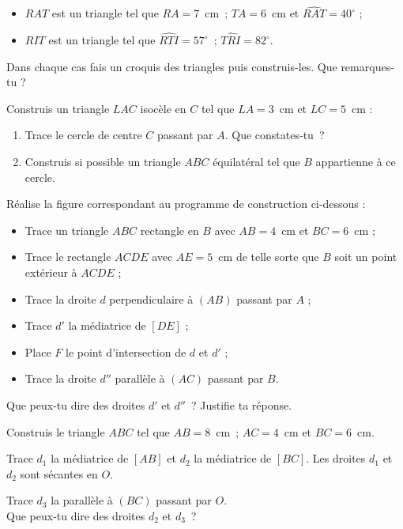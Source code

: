 \begin{exercice}
\begin{itemize}
 \item $RAT$ est un triangle tel que $RA = 7$ cm ; $TA = 6$ cm et $\widehat{RAT} = 40^\circ$ ;
 \item $RIT$ est un triangle tel que $\widehat{RTI} = 57^\circ$ ; $\widehat{TRI} = 82^\circ$.
 \end{itemize}
Dans chaque cas fais un croquis des triangles puis construis-les. Que remarques-tu ? 
\end{exercice}


\begin{exercice}
Construis un triangle $LAC$ isocèle en $C$ tel que $LA = 3$ cm et $LC = 5$ cm :
\begin{enumerate}
 \item Trace le cercle de centre $C$ passant par $A$. Que constates‑tu ?
 \item Construis si possible un triangle $ABC$ équilatéral tel que $B$ appartienne à ce cercle.
 \end{enumerate}
\end{exercice}


\begin{exercice}
Réalise la figure correspondant au programme de construction ci‑dessous :
\begin{itemize}
 \item Trace un triangle $ABC$ rectangle en $B$ avec $AB = 4$ cm et $BC = 6$ cm ;
 \item Trace le rectangle $ACDE$ avec $AE = 5$ cm de telle sorte que $B$ soit un point extérieur à $ACDE$ ;
 \item Trace la droite $d$ perpendiculaire à $(AB)$ passant par $A$ ;
 \item Trace $d'$ la médiatrice de $[DE]$ ;
 \item Place $F$ le point d'intersection de $d$ et $d'$ ;
 \item Trace la droite $d''$ parallèle à $(AC)$ passant par $B$.
 \end{itemize}
Que peux‑tu dire des droites $d'$ et $d''$ ? Justifie ta réponse.
\end{exercice}


\begin{exercice}
Construis le triangle $ABC$ tel que $AB = 8$ cm ; $AC = 4$ cm et $BC = 6$ cm.

Trace $d_1$ la médiatrice de $[AB]$ et $d_2$ la médiatrice de $[BC]$. Les droites $d_1$ et $d_2$ sont sécantes en $O$.

Trace $d_3$ la parallèle à $(BC)$ passant par $O$. \\[0.5em]
Que peux‑tu dire des droites $d_2$ et $d_3$ ?
\end{exercice}


